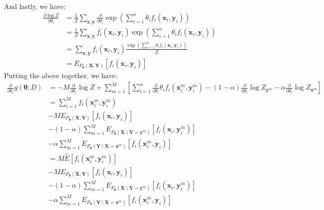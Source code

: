\documentclass[12pt]{article}
\newcommand{\vect}[1]{\boldsymbol{#1}}
\begin{document}
\begin{enumerate}[label=(\alph*)]
$$  $$
  And lastly, we have:
  \begin{align*}
  	\frac{\partial \log Z}{\partial \theta_i} &= \frac{1}{Z} \sum_{\vect{x}, \vect{y}} \frac{\partial}{\partial \theta_i} \exp\left(\sum_{i =1}^n \theta_i f_i(\vect{x}_i, \vect{y}_i)\right) \\
  	&= \frac{1}{Z} \sum_{\vect{x}, \vect{y}} f_i(\vect{x}_i, \vect{y}_i) \exp\left(\sum_{i =1}^n \theta_i f_i(\vect{x}_i, \vect{y}_i)\right)  \\
  	&= \sum_{\vect{x}, \vect{y}} f_i(\vect{x}_i, \vect{y}_i) \frac{\exp\left(\sum_{i =1}^n \theta_i f_i(\vect{x}_i, \vect{y}_i)\right) }{Z} \\
  	&= E_{P_{\vect{\theta}}(\vect{X}, \vect{Y})}[f_i(\vect{x}_i, \vect{y}_i)]
  \end{align*}
  Putting the above together, we have:
  \begin{align*}
  	\frac{\partial }{\partial \theta_i}g(\vect{\theta};D) &= -M\frac{\partial }{\partial \theta_i} \log Z + \sum_{m=1}^M\left[ \sum_{i=1}^n \frac{\partial }{\partial \theta_i} \theta_i f_i(\vect{x}_i^m, \vect{y}_i^m) - (1-\alpha)\frac{\partial }{\partial \theta_i} \log Z_{\vect{y}^m} - \alpha \frac{\partial }{\partial \theta_i}\log Z_{\vect{x}^m} \right] \\
  	&= \sum_{i=1}^M f_i(\vect{x}_i^m, \vect{y}_i^m) \\
  	&- ME_{P_{\vect{\theta}}(\vect{X}, \vect{Y})}[f_i(\vect{x}_i, \vect{y}_i)] \\
  	&- (1-\alpha)\sum_{m=1}^M E_{P_{\vect{\theta}}(\vect{X} \mid \vect{Y} = \vect{y}^{m})}[f_i(\vect{x}_i, \vect{y}_i^m)] \\
  	&- \alpha\sum_{m=1}^M E_{P_{\vect{\theta}}(\vect{Y} \mid \vect{X} = \vect{x}^{m})}[f_i(\vect{x}_i^m, \vect{y}_i)] \\
  	&= M\hat{E}[f_i(\vect{x}_i^m, \vect{y}_i^m)] \tag{Sample Mean} \\
  	&- ME_{P_{\vect{\theta}}(\vect{X}, \vect{Y})}[f_i(\vect{x}_i, \vect{y}_i)] \tag{True Mean}\\
  	&- (1-\alpha)\sum_{m=1}^M E_{P_{\vect{\theta}}(\vect{X} \mid \vect{Y} = \vect{y}^{m})}[f_i(\vect{x}_i, \vect{y}_i^m)] \tag{Conditional Expectation $X \mid Y$}\\
  	&- \alpha\sum_{m=1}^M E_{P_{\vect{\theta}}(\vect{Y} \mid \vect{X} = \vect{x}^{m})}[f_i(\vect{x}_i^m, \vect{y}_i)] \tag{Condtional Expectation $Y \mid X$}
  \end{align*}
\end{enumerate}
\end{document}
